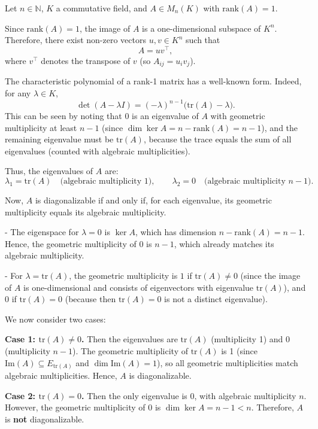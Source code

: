 \documentclass[12pt]{article}
\begin{document}
\begin{correctionbox}
Let $ n \in \mathbb{N} $, $ K $ a commutative field, and $ A \in M_n(K) $ with $ \mathrm{rank}(A) = 1 $.

Since $ \mathrm{rank}(A) = 1 $, the image of $ A $ is a one-dimensional subspace of $ K^n $. Therefore, there exist non-zero vectors $ u, v \in K^n $ such that 
\[
A = u v^\top,
\]
where $ v^\top $ denotes the transpose of $ v $ (so $ A_{ij} = u_i v_j $).

The characteristic polynomial of a rank-1 matrix has a well-known form. Indeed, for any $ \lambda \in K $,
\[
\det(A - \lambda I) = (-\lambda)^{n-1} \bigl( \mathrm{tr}(A) - \lambda \bigr).
\]
This can be seen by noting that $ 0 $ is an eigenvalue of $ A $ with geometric multiplicity at least $ n - 1 $ (since $ \dim \ker A = n - \mathrm{rank}(A) = n - 1 $), and the remaining eigenvalue must be $ \mathrm{tr}(A) $, because the trace equals the sum of all eigenvalues (counted with algebraic multiplicities).

Thus, the eigenvalues of $ A $ are:
\[
\lambda_1 = \mathrm{tr}(A) \quad \text{(algebraic multiplicity 1)}, \qquad \lambda_2 = 0 \quad \text{(algebraic multiplicity } n-1\text{)}.
\]

Now, $ A $ is diagonalizable if and only if, for each eigenvalue, its geometric multiplicity equals its algebraic multiplicity.

- The eigenspace for $ \lambda = 0 $ is $ \ker A $, which has dimension $ n - \mathrm{rank}(A) = n - 1 $. Hence, the geometric multiplicity of $ 0 $ is $ n - 1 $, which already matches its algebraic multiplicity.

- For $ \lambda = \mathrm{tr}(A) $, the geometric multiplicity is $ 1 $ if $ \mathrm{tr}(A) \neq 0 $ (since the image of $ A $ is one-dimensional and consists of eigenvectors with eigenvalue $ \mathrm{tr}(A) $), and $ 0 $ if $ \mathrm{tr}(A) = 0 $ (because then $ \mathrm{tr}(A) = 0 $ is not a distinct eigenvalue).

We now consider two cases:

\textbf{Case 1: $ \mathrm{tr}(A) \neq 0 $.}  
Then the eigenvalues are $ \mathrm{tr}(A) $ (multiplicity 1) and $ 0 $ (multiplicity $ n-1 $). The geometric multiplicity of $ \mathrm{tr}(A) $ is 1 (since $ \mathrm{Im}(A) \subseteq E_{\mathrm{tr}(A)} $ and $ \dim \mathrm{Im}(A) = 1 $), so all geometric multiplicities match algebraic multiplicities. Hence, $ A $ is diagonalizable.

\textbf{Case 2: $ \mathrm{tr}(A) = 0 $.}  
Then the only eigenvalue is $ 0 $, with algebraic multiplicity $ n $. However, the geometric multiplicity of $ 0 $ is $ \dim \ker A = n - 1 < n $. Therefore, $ A $ is \textbf{not} diagonalizable.


\end{correctionbox}
\end{document}

